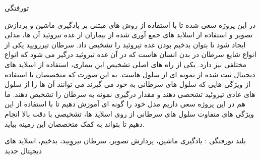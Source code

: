 

\pagestyle{empty}

‌تورفتگی

در این پروژه سعی شده تا با استفاده از روش های مبتنی بر یادگیری ماشین و پردازش تصویر و استفاده از اسلاید های جمع آوری شده از بیماران از غده تیروئید آن ها، مدلی ایجاد شود تا بتوان بدخیم بودن غده تیروئید را تشخیص داد.
سرطان تیررویید یکی از انواع شایع سرطان در بدن انسان هاست که در آن غده تیروئید درگیر می شود که انواع مختلفی نیز دارد.
یکی از راه های اصلی تشخیص این بیماری، استفاده از اسلاید های دیجیتال ثبت شده از نمونه ای از سلول هاست.
به این صورت که متخصصان با استفاده از ویژگی هایی که سلول های سرطانی به خود می گیرند می توانند آن ها را از سلول های عادی تیروئید تشخصی دهند و مقدار درگیری نمونه به سرطان را تشخیص دهند.
ما هم در این پروژه سعی داریم مدل خود را گونه ای آموزش دهیم تا با استفاده از این ویژگی های متفاوت سلول های سرطانی از روی اسلاید ها، تشخیصی با دقت بالا انجام دهیم تا بتواند به کمک متخصصان این زمینه بیاید.

‌بلند
‌تورفتگی :
یادگیری ماشین، پردازش تصویر، سرطان تیروِیید، بدخیم، اسلاید های دیجیتال
‌جدید
